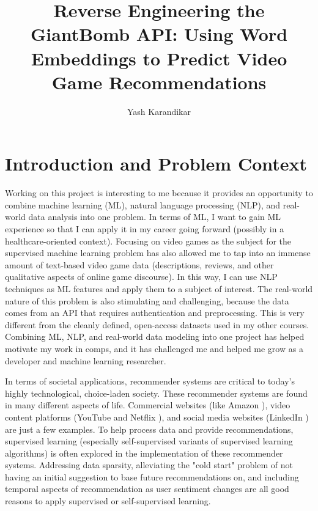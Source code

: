\documentclass[10pt,twocolumn]{article}
\title{Reverse Engineering the GiantBomb API: Using Word Embeddings to Predict Video Game Recommendations}
\author{Yash Karandikar}
\affiliation{Occidental College}
\begin{document}
\maketitle
 
\section{Introduction and Problem Context}


Working on this project is interesting to me because it provides an opportunity to combine machine learning (ML), natural language processing (NLP), and real-world data analysis into one problem. In terms of ML, I want to gain ML experience so that I can apply it in my career going forward (possibly in a healthcare-oriented context). Focusing on video games as the subject for the supervised machine learning problem has also allowed me to tap into an immense amount of text-based video game data (descriptions, reviews, and other qualitative aspects of online game discourse). In this way, I can use NLP techniques as ML features and apply them to a subject of interest. The real-world nature of this problem is also stimulating and challenging, because the data comes from an API that requires authentication and preprocessing. This is very different from the cleanly defined, open-access datasets used in my other courses. Combining ML, NLP, and real-world data modeling into one project has helped motivate my work in comps, and it has challenged me and helped me grow as a developer and machine learning researcher.

In terms of societal applications, recommender systems are critical to today's highly technological, choice-laden society. These recommender systems are found in many different aspects of life. Commercial websites (like Amazon \cite{AmazonRS}), video content platforms (YouTube \cite{YouTubeRS} and Netflix \cite{NetflixRS}), and social media websites (LinkedIn \cite{LinkedInRS}) are just a few examples. To help process data and provide recommendations, supervised learning (especially self-supervised variants of supervised learning algorithms) is often explored in the implementation of these recommender systems. Addressing data sparsity, alleviating the "cold start" problem of not having an initial suggestion to base future recommendations on, and including temporal aspects of recommendation as user sentiment changes are all good reasons to apply supervised or self-supervised learning. \cite{JYu, XXin, Matuszyk}
\end{document}
